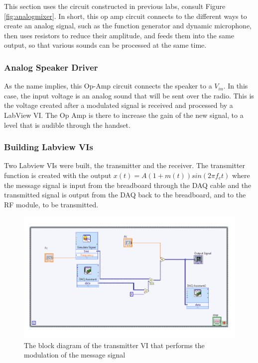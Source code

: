 \documentclass[10pt]{article}
\begin{document}
This section uses the circuit constructed in previous labs, consult Figure \ref{fig:analogmixer}. In short, this op amp circuit connects to the different ways to create an analog signal, such as the function generator and dynamic microphone, then uses resistors to reduce their amplitude, and feeds them into the same output, so that various sounds can be processed at the same time. 

\subsubsection{Analog Speaker Driver}

As the name implies, this Op-Amp circuit connects the speaker to a $V_{in}$. In this case, the input voltage is an analog sound that will be sent over the radio. This is the voltage created after a modulated signal is received and processed by a LabView VI. The Op Amp is there to increase the gain of the new signal, to a level that is audible through the handset. 

\subsubsection{Building Labview VIs}

Two Labview VIs were built, the transmitter and the receiver. The transmitter function is created with the output $x(t)  = A (1 + m(t)) sin(2 \pi f_c t)$ where the message signal is input from the breadboard through the DAQ cable and the transmitted signal is output from the DAQ back to the breadboard, and to the RF module, to be transmitted.

 \begin{center}
 	\begin{figure}[H]
 		\centering
 		\includegraphics[scale = 0.68]{images/transmitterblock.png}
 		\caption{The block diagram of the transmitter VI that performs the modulation of the message signal}
 		\label{fig:transmitterblock}
 	\end{figure}
 \end{center}
\end{document}
